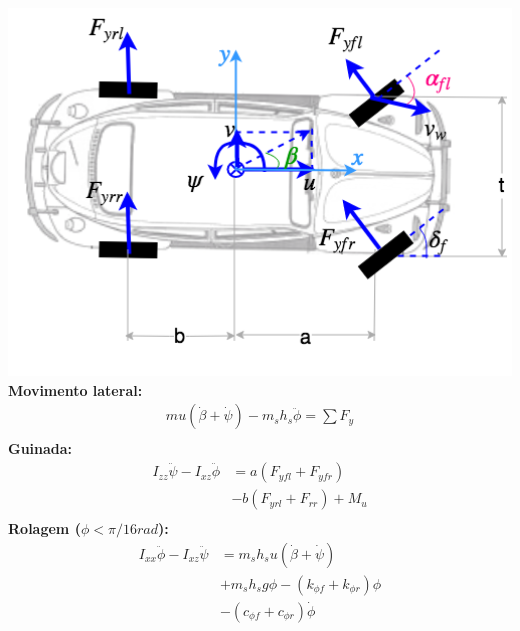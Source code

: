 \documentclass{beamer}
\begin{document}
 \begin{frame}[t]%
            
 \begin{columns}%
      \includegraphics[width=1\textwidth]{carmodel.png}%
      \small
 \noindent\textbf{Movimento lateral:}
 \vspace{-0.2 cm}
    \begin{equation*}    
    \begin{split}
       	mu\left(\dot{\beta} + \dot{\psi} \right) -m_sh_s\ddot{\phi} =
       	\sum{F_y}
       	\\
    \end{split}
    \end{equation*}
\vspace{-0.2 cm}
\noindent\textbf{Guinada:} 
\vspace{-0.2 cm}
    \begin{equation*}  
    \begin{split}
       I_{zz}\ddot{\psi} - I_{xz}\ddot{\phi} &= a(F_{yfl} + F_{yfr}) \\
       &- b(F_{yrl} + F_{rr}) + M_u \\
    \end{split}
    \end{equation*}
\vspace{-0.2 cm}
\noindent\textbf{Rolagem ($\phi < \pi/16 rad$):}
\begin{equation*}
\begin{split}
	I_{xx}\ddot{\phi} - I_{xz}\ddot{\psi} & =  m_sh_su(\dot{\beta} + \dot{\psi}) \\
	& + m_sh_sg\phi - (k_{\phi f} + k_{\phi r} ) \phi \\ 
	& - ( c_{\phi f} + c_{\phi r} ) \dot{\phi} \\
 \end{split}        
\end{equation*} 
\vspace{-0.2 cm}
    \end{columns}%
\end{frame}%
\end{document}
